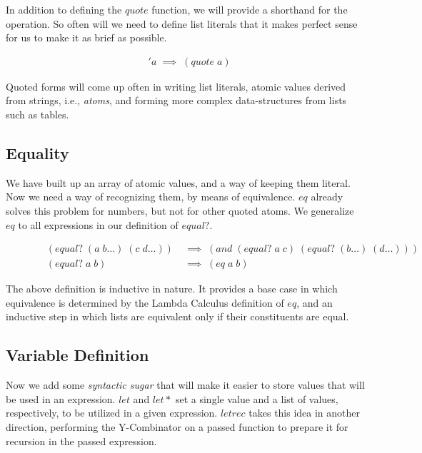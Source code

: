 In addition to defining the $quote$ function, we will provide a shorthand for the 
operation. So often will we need to define list literals that it makes perfect 
sense for us to make it as brief as possible.

\begin{figure}[ht]
\caption{}\label{scheme}
\begin{align*}
& 'a \; \implies \; (quote \; a)
\end{align*}
\end{figure}

Quoted forms will come up often in writing list literals, atomic values derived 
from strings, i.e., \emph{atoms}, and forming more complex data-structures from lists 
such as tables.

\subsection{Equality}
We have built up an array of atomic values, and a way of keeping them literal. Now 
we need a way of recognizing them, by means of equivalence. $eq$ already solves 
this problem for numbers, but not for other quoted atoms. We generalize $eq$ to 
all expressions in our definition of $equal?$.

\begin{figure}[ht]
\caption{}\label{scheme}
\begin{align*}
& (equal? \; (a \; b\dots) \; (c \; d\dots)) \; &\implies \; (and \; (equal? \; a \; c) \; (equal? \; (b\dots) \; (d\dots)))
\\& (equal? \; a \; b) \; &\implies \; (eq \; a \; b)
\end{align*}
\end{figure}

The above definition is inductive in nature. It provides a base case in which 
equivalence is determined by the Lambda Calculus definition of $eq$, and an 
inductive step in which lists are equivalent only if their constituents are equal.

\subsection{Variable Definition}
Now we add some \emph{syntactic sugar} that will make it easier to store values that 
will be used in an expression. $let$ and $let*$ set a single value and a list of 
values, respectively, to be utilized in a given expression. $letrec$ takes this 
idea in another direction, performing the Y-Combinator on a passed function to 
prepare it for recursion in the passed expression.

